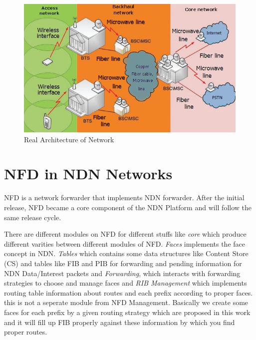 \begin{figure}[H]

\begin{center}

\includegraphics[scale = 0.35]{Pictures/network.png}

\caption{Real Architecture of Network} \label{network} 

\end{center}

\end{figure}



\section{NFD in NDN Networks}
NFD is a network forwarder that implements NDN forwarder. After the initial release, NFD became a core component of the NDN Platform and will follow the same release cycle. 

There are different modules on NFD for different stuffs like \textit{core} which produce different varities between different modules of NFD. \textit{Faces} implements the face concept in NDN. \textit{Tables} which contains some data structures like Content Store (CS) and tables like FIB and PIB for forwarding and pending information for NDN Data/Interest packets and \textit{Forwarding}, which interacts with forwarding strategies to choose and manage faces and \textit{RIB Management} which implements routing table information about routes and each prefix according to proper faces. this is not a seperate module from NFD Management. Basically we create some faces for each prefix by a given routing strategy which are proposed in this work and it will fill up FIB properly against these information by which you find proper routes.

